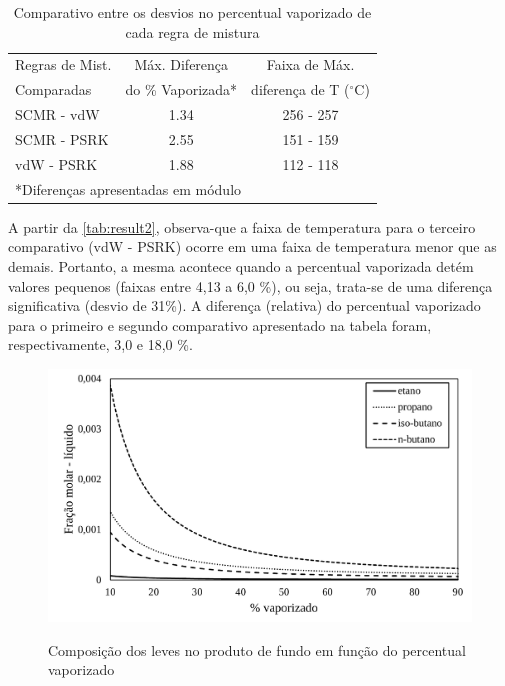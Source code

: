 \clearpage
\begin{table}[htb]
\renewcommand{\arraystretch}{1.3}
\caption{Comparativo entre os desvios no percentual vaporizado de cada regra de
mistura}
\footnotesize
\center 
\begin{tabular}{lcc}   
\toprule
  {Regras de Mist.} &{Máx. Diferença}&{Faixa de Máx.} \\
   {Comparadas}&{do \% Vaporizada*}&{diferença de T ($^\circ$C)} \\
\midrule 
{SCMR - vdW}	&	1.34	&	{256 - 257}	 \\
{SCMR - PSRK}	&	2.55	&	{151 - 159}	 \\
{vdW - PSRK}	&	1.88	&	{112 - 118}	 \\
\bottomrule
\multicolumn{3}{l}{*Diferenças apresentadas em módulo}
\end{tabular}
\label{tab:result2}
\end{table}

A partir da \autoref{tab:result2}, observa-que a faixa de temperatura para o
terceiro comparativo (vdW - PSRK) ocorre em uma faixa de temperatura menor que
as demais. Portanto, a mesma acontece quando a percentual vaporizada detém
valores pequenos (faixas entre 4,13 a 6,0 {\%}), ou seja, trata-se de uma
diferença significativa (desvio de 31{\%}). A diferença (relativa) do percentual
vaporizado para o primeiro e segundo comparativo apresentado na tabela foram,
respectivamente, 3,0 e 18,0 {\%}.

\clearpage


\begin{figure}[htb]
\centering
{\includegraphics[width=1.0\textwidth]{img/trab3liq.pdf}} 
\caption{Composição dos leves no produto de fundo em função do
percentual vaporizado}
\label{fig:liq}
\end{figure}

